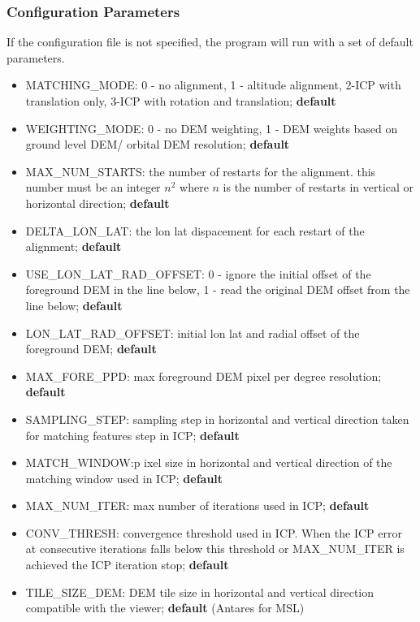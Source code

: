 \subsubsection{Configuration Parameters}
If the configuration file is not specified, the program will run with a set of default parameters.
\begin{itemize}


	\item{\textsc{MATCHING\_MODE}}: 0 - no alignment, 1 - altitude alignment, 2-ICP with translation only, 3-ICP with rotation and translation; {\bf default}
        \item{\textsc{WEIGHTING\_MODE}}: 0 - no DEM weighting, 1 - DEM weights based on ground level DEM/ orbital DEM resolution; {\bf default}
        \item{\textsc{MAX\_NUM\_STARTS}}: the number of restarts for the alignment. this number must be an integer $n^2$ where $n$ is the number of restarts in vertical or horizontal direction; {\bf default}
        \item{\textsc{DELTA\_LON\_LAT}}: the lon lat dispacement for each restart of the alignment; {\bf default}
        \item{\textsc{USE\_LON\_LAT\_RAD\_OFFSET}}: 0 - ignore the initial offset of the foreground DEM in the line below, 1 - read the original DEM offset from the line below; {\bf default} 
        \item{\textsc{LON\_LAT\_RAD\_OFFSET}}: initial lon lat and radial offset of the foreground DEM; {\bf default}
        \item{\textsc{MAX\_FORE\_PPD}}: max foreground DEM pixel per degree resolution; {\bf default}
        \item{\textsc{SAMPLING\_STEP}}: sampling step in horizontal and vertical direction taken for matching features step in ICP; {\bf default}
	\item{\textsc{MATCH\_WINDOW}}:p ixel size in horizontal and vertical direction of the matching window used in ICP; {\bf default}
        \item{\textsc{MAX\_NUM\_ITER}}: max number of iterations used in ICP; {\bf default}
        \item{\textsc{CONV\_THRESH}}: convergence threshold used in ICP. When the ICP error at consecutive iterations falls below this threshold or 
                                      MAX\_NUM\_ITER is achieved the ICP iteration stop; {\bf default}
        \item{\textsc{TILE\_SIZE\_DEM}}: DEM tile size in horizontal and vertical direction compatible with the viewer; {\bf default} (Antares for MSL)

\end{itemize}
